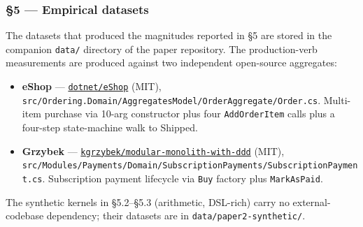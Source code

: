 \documentclass[
]{article}
\providecommand{\tightlist}{%
  \setlength{\itemsep}{0pt}\setlength{\parskip}{0pt}}
\let\origtexttt\texttt%
\renewcommand{\texttt}[1]{\origtexttt{\seqsplit{#1}}}%
\let\texttt\origtexttt%
\begin{document}
\subsubsection{§5 --- Empirical datasets}\label{empirical-datasets}

The datasets that produced the magnitudes reported in §5 are stored in
the companion \texttt{data/} directory of the paper repository. The
production-verb measurements are produced against two independent
open-source aggregates:

\begin{itemize}
\tightlist
\item
  \textbf{eShop} ---
  \href{https://github.com/dotnet/eShop}{\texttt{dotnet/eShop}} (MIT),
  \texttt{src/Ordering.Domain/AggregatesModel/OrderAggregate/Order.cs}.
  Multi-item purchase via 10-arg constructor plus four
  \texttt{AddOrderItem} calls plus a four-step state-machine walk to
  Shipped.
\item
  \textbf{Grzybek} ---
  \href{https://github.com/kgrzybek/modular-monolith-with-ddd}{\texttt{kgrzybek/modular-monolith-with-ddd}}
  (MIT),
  \texttt{src/Modules/Payments/Domain/SubscriptionPayments/SubscriptionPayment.cs}.
  Subscription payment lifecycle via \texttt{Buy} factory plus
  \texttt{MarkAsPaid}.
\end{itemize}

The synthetic kernels in §5.2--§5.3 (arithmetic, DSL-rich) carry no
external-codebase dependency; their datasets are in
\texttt{data/paper2-synthetic/}.
\end{document}
